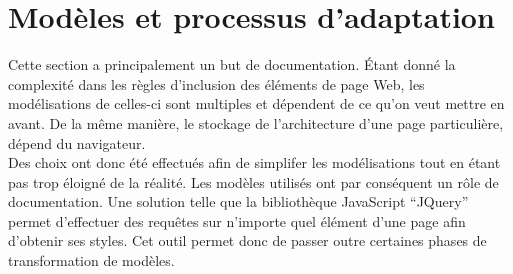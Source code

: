 \documentclass[french,a4paper]{report}
\begin{document}
{\section{Modèles et processus d'adaptation}
Cette section a principalement un but de documentation. Étant donné la
complexité dans les règles d'inclusion des éléments de page Web, les
modélisations de celles-ci sont multiples et dépendent de ce qu'on
veut mettre en avant. De la même manière, le stockage de
l'architecture d'une page
particulière, dépend du navigateur.\\
Des choix ont donc été effectués afin de simplifer les modélisations
tout en étant pas trop éloigné de la réalité. Les modèles utilisés ont
par conséquent un rôle de documentation. Une solution telle que la
bibliothèque JavaScript \enquote{JQuery} permet d'effectuer des
requêtes sur n'importe quel élément d'une page afin d'obtenir ses
styles. Cet outil permet donc de passer outre certaines phases de
transformation de modèles.
}
\end{document}
